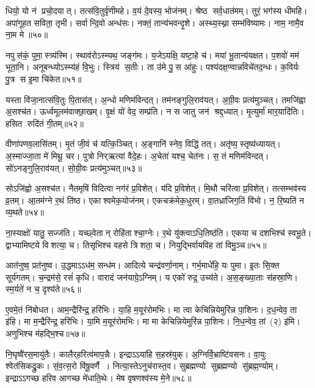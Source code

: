 धियो॒ यो न॑ प्रचो॒दयात्‌। तत्स॑वि॒तुर्वृ॑णीमहे। 
व॒यं दे॒वस्य॒ भोज॑नम्‌। श्रेष्ठ सर्व॒धात॑मम्‌। 
तुरं॒ भग॑स्य धीमहि। अपा॑गूहत सविता॒ तृभी\sn। 
सर्वान्दि॒वो अन्ध॑सः। नक्तं॒ तान्य॑भवन्दृ॒शे। 
अस्थ्य॒स्थ्ना सम्भ॑विष्यामः। नाम॒ नामै॒व ना॒म मे॥५०॥


नपुस॑कं॒ पुमा॒स्त्र्य॑स्मि। स्थाव॑रोऽस्म्यथ॒ जङ्ग॑मः। 
य॒जेऽयक्षि॒ यष्टा॒हे च॑। मया॑ भू॒तान्य॑यक्षत। 
प॒शवो॑ मम॑ भूता॒नि। अनूबन्ध्योऽस्म्य॑हं वि॒भुः। 
स्त्रिय॑ स॒तीः। ता उ॑मे पु॒स आ॑हुः। 
पश्य॑दक्ष॒ण्वान्नविचे॑तद॒न्धः। क॒विर्यः पु॒त्र स इ॒मा चि॑केत॥५१॥


यस्ता वि॑जा॒नात्स॑वि॒तुः पि॒तास॑त्‌। अ॒न्धो मणिम॑विन्दत्‌। 
तम॑नङ्गुलि॒राव॑यत्‌। अ॒ग्री॒वः प्रत्य॑मुञ्चत्‌। 
तमजि॑ह्वा अ॒सश्च॑त। ऊर्ध्वमूलम॑वाक्छा॒खम्‌। 
वृ॒क्षं यो॑ वेद॒ सम्प्र॑ति। न स जातु जन॑ श्रद्द॒ध्यात्‌। 
मृ॒त्युर्मा॑ मार॒यादि॑तिः। हसित रुदि॑तं गी॒तम्‌॥५२॥


वीणा॑पणव॒लासि॑तम्‌। मृ॒तं जी॒वं च॑ यत्कि॒ञ्चित्। 
अ॒ङ्गानि॑ स्नेव॒ विद्धि॑ तत्‌। अतृ॑ष्य॒स्तृष्य॑ध्यायत्‌। 
अ॒स्माज्जा॒ता मे॑ मिथू॒ चर\snn। पुत्रो निर्‌ऋत्या॑ वैदे॒हः। 
अ॒चेता॑ यश्च॒ चेत॑नः। स॒ तं मणिम॑विन्दत्‌। 
सो॑ऽनङ्गुलि॒राव॑यत्‌। सो॒\aav{}ग्री॒वः प्रत्य॑मुञ्चत्‌॥५३॥


सोऽजि॑ह्वो अ॒सश्च॑त। नैतमृषिं विदित्वा नग॑रं प्र॒विशेत्‌। 
य॑दि प्र॒विशेत्‌। मि॒थौ चरि॑त्वा प्र॒विशेत्‌। 
तत्सम्भव॑स्य व्र॒तम्‌। आ॒तम॑ग्ने र॒थं ति॑ष्ठ। 
एकाश्वमेक॒योज॑नम्‌। एकचक्र॑मेक॒धुरम्‌। 
वा॒तध्रा॑जिग॒तिं वि॑भो। न॒ रि॒ष्यति॑ न व्य॒थते॥५४॥


ना॒स्याक्षो॑ यातु॒ सज्ज॑ति। यच्छ्वेतान्‌ रोहि॑ताश्चा॒ग्नेः। 
र॒थे यु॑क्त्वाऽधि॒\-तिष्ठ॑ति। एकया च दशभिश्च॑ स्वभू॒ते। 
द्वाभ्यामिष्टये विशत्या॒ च। तिसृभिश्च वहसे त्रिशता॒ च। 
नियुद्भिर्वायविह ता॑ विमु॒ञ्च॥५५॥\anuvakamend


आत॑नुष्व॒ प्रत॑नुष्व। उ॒द्धमाऽऽध॑म॒ सन्ध॑म। 
आदित्ये चन्द्र॑वर्णा॒नाम्‌। गर्भ॒माधे॑हि॒ यः पुमा\sn{}। 
इ॒तः सि॒क्त सूर्य॑गतम्‌। च॒न्द्रम॑से॒ रसं॑ कृधि। 
वारादं जन॑याग्रे॒ऽग्निम्‌। य एको॑ रुद्र॒ उच्य॑ते। 
अ॒स॒ङ्ख्या॒ताः स॑हस्रा॒णि। स्म॒र्यते॑ न च॒ दृश्य॑ते॥५६॥


ए॒वमे॒तं नि॑बोधत। आम॒न्द्रैरि॑न्द्र॒ हरि॑भिः। 
या॒हि म॒यूर॑रोमभिः। मा त्वा केचिन्नियेमुरि॑न्न पा॒शिनः। 
द॒ध॒न्वेव॒ ता इ॑हि। मा म॒न्द्रैरि॑न्द्र॒ हरि॑भिः। 
या॒मि म॒यूर॑रोमभिः। मा मा केचिन्नियेमुरि॑न्न पा॒शिनः। 
नि॒ध॒न्वेव॒ \mbox{तां (२)} इ॑मि। अणुभिश्च म॑हद्भि॒श्च॥५७॥


नि॒घृष्वै॑रस॒मायु॑तैः। कालैर्‌हरित्व॑माप॒न्नैः। 
इन्द्राऽऽया॑हि स॒हस्र॑युक्‌। अ॒ग्निर्वि॒भ्राष्टि॑वसनः। 
वा॒युः श्वेत॑सिकद्रु॒कः। सं॒व॒त्स॒रो वि॑षू॒वर्णै। 
नित्या॒स्तेऽनुच॑रास्त॒व। सुब्रह्मण्यो सुब्रह्मण्यो सु॑ब्रह्म॒ण्योम्‌। 
इन्द्राऽऽगच्छ हरिव आगच्छ मे॑धाति॒थेः। मेष वृषणश्व॑स्य मे॒ने॥५८॥


